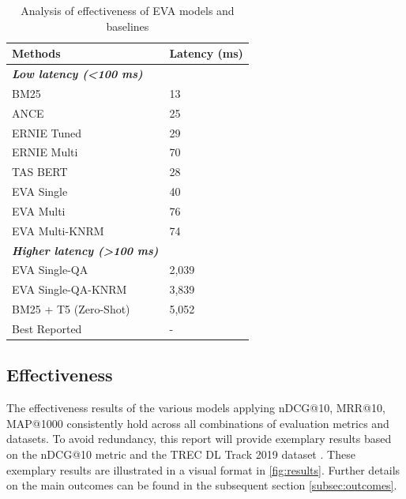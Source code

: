 \def\arraystretch{1.2}
\begin{table}[!htb]
    \scriptsize
    \centering
    \begin{tabular}{l|l}
    \textbf{Methods}                                        & \textbf{Latency (ms)} \\ \hline
    \textit{\textbf{Low latency (\textless{}100 ms)}}       & \textit{\textbf{}}    \\ \hline
    BM25                                                    & 13                    \\
    ANCE                                                    & 25                    \\
    ERNIE Tuned                                             & 29                    \\
    ERNIE Multi                                             & 70                    \\
    TAS BERT                                                & 28                    \\
    EVA Single                                              & 40                    \\
    EVA Multi                                               & 76                    \\
    EVA Multi-KNRM                                          & 74                    \\ \hline
    \textit{\textbf{Higher latency (\textgreater{}100 ms)}} & \textit{\textbf{}}    \\ \hline
    EVA Single-QA                                           & 2,039                  \\
    EVA Single-QA-KNRM                                      & 3,839                  \\
    BM25 + T5 (Zero-Shot)                                   & 5,052                  \\ \hline
    Best Reported                                           & -                    
    \end{tabular}
    \caption{Analysis of effectiveness of EVA models and baselines}
    \label{tab:results_effectiveness}
\end{table}

\subsection{Effectiveness}\label{sec:effectiveness}

The effectiveness results of the various models applying nDCG@10, MRR@10, MAP@1000 consistently hold across all combinations of evaluation metrics and datasets. To avoid redundancy, this report will provide exemplary results based on the nDCG@10 metric and the TREC DL Track 2019 dataset \cite{trec_dl_2019}. These exemplary results are illustrated in a visual format in \autoref{fig:results}. Further details on the main outcomes can be found in the subsequent section \ref{subsec:outcomes}.

